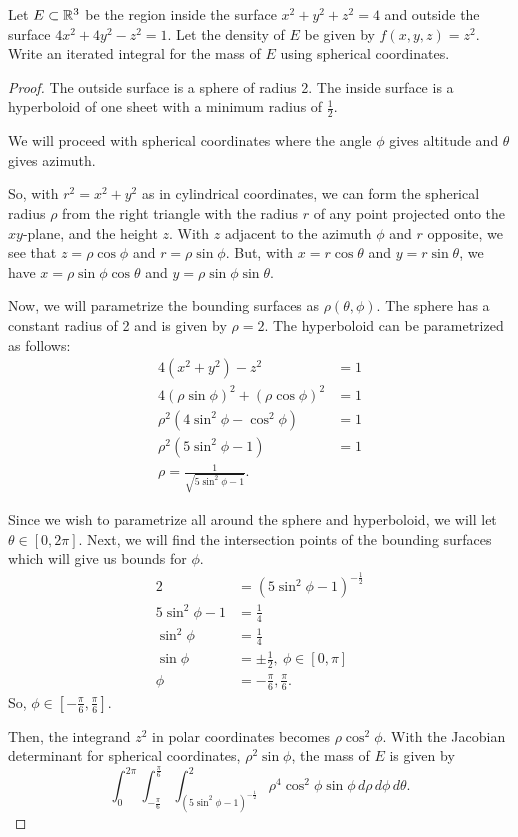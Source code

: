\documentclass[../hw8]{subfiles}
\begin{document}
\begin{problem}[2]
Let $E \subset \mathbb{R}^3$ be the region inside the surface $x^2 + y^2 + z^2=4$ and outside the surface $4x^2 + 4y^2 - z^2=1$.
Let the density of $E$ be given by  $f(x,y,z)=z^2$.
Write an iterated integral for the mass of $E$ using spherical coordinates.
\end{problem}
\begin{proof}
	The outside surface is a sphere of radius 2.
	The inside surface is a hyperboloid of one sheet with a minimum radius of $\frac{1}{2}$.

	We will proceed with spherical coordinates where the angle $\phi$ gives altitude and  $\theta$ gives azimuth.

	So, with  $r^2=x^2 + y^2$ as in cylindrical coordinates, we can form the spherical radius $\rho$ from the right triangle with the radius $r$ of any point projected onto the $xy$-plane, and the height  $z$.
	With  $z$ adjacent to the azimuth  $\phi$ and  $r$ opposite, we see that $z=\rho\cos\phi$ and $r=\rho\sin\phi$.
	But, with $x=r\cos\theta$ and $y=r\sin\theta$, we have $x=\rho\sin\phi\cos\theta$ and $y=\rho\sin\phi\sin\theta$.

	Now, we will parametrize the bounding surfaces as $\rho(\theta,\phi)$.
	The sphere has a constant radius of 2 and is given by $\rho=2$.
	The hyperboloid can be parametrized as follows: \begin{align*}
		4(x^2 + y^2) - z^2                       & = 1 \\
		4{(\rho\sin\phi)}^2 + {(\rho\cos\phi)}^2 & = 1 \\
		\rho^2(4\sin^2\phi-\cos^2\phi)           & = 1 \\
		\rho^2(5\sin^2\phi-1)                    & = 1 \\
		\rho=\frac{1}{\sqrt{5\sin^2\phi-1} }
		.\end{align*}

	Since we wish to parametrize all around the sphere and hyperboloid, we will let $\theta\in [0,2\pi]$.
	Next, we will find the intersection points of the bounding surfaces which will give us bounds for $\phi$.
	\begin{align*}
		2             & = {(5\sin^2\phi-1)}^{-\frac{1}{2}}    \\
		5\sin^2\phi-1 & = \frac{1}{4}                         \\
		\sin^2\phi    & = \frac{1}{4}                         \\
		\sin\phi      & =  \pm \frac{1}{2},\  \phi\in [0,\pi] \\
		\phi          & = -\frac{\pi}{6},\frac{\pi}{6}
		.\end{align*}
	So, $\phi\in \left[-\frac{\pi}{6},\frac{\pi}{6}\right]$.

	Then, the integrand $z^2$ in polar coordinates becomes $\rho\cos^2\phi$.
	With the Jacobian determinant for spherical coordinates, $\rho^2\sin\phi$, the mass of $E$ is given by  \[
		\int_{0}^{2\pi}\int_{-\frac{\pi}{6}}^{\frac{\pi}{6}}\int_{{(5\sin^2\phi-1)}^{-\frac{1}{2}}}^{2}\rho^4\cos^2\phi\sin\phi  \,d\rho  \,d\phi  \,d\theta
		.\]
\end{proof}
\end{document}
